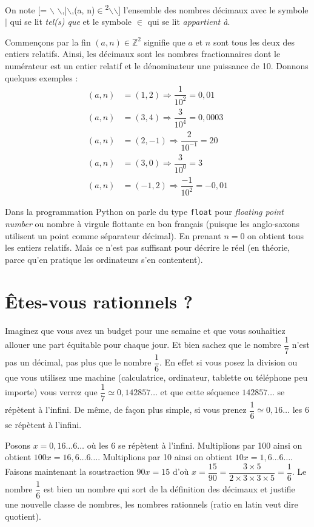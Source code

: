 \documentclass[a4paper, 11pt, twoside]{book}
\newcommand{\Z}{\mathbb{Z}}
\newcommand{\D}{\mathbb{D}}
\begin{document}
On note [\D = \left$\backslash${ $\backslash$,|$\backslash$,(a, n)\(\in\)\Z\textsuperscript{2\right}$\backslash$}$\backslash$]
l'ensemble des nombres décimaux avec le symbole \(|\) qui se lit
\emph{tel(s) que} et le symbole \(\in\) qui se lit \emph{appartient à}.

Commençons par la fin \((a, n)\in\Z^2\) signifie que \(a\) et
\(n\) sont tous les deux des entiers relatifs. Ainsi, les décimaux
sont les nombres fractionnaires dont le numérateur est un entier
relatif et le dénominateur une puissance de 10. Donnons quelques
exemples :
\begin{align*}
(a, n) &= (1, 2)\Rightarrow \dfrac{1}{10^2} = 0,01\\
(a, n) &= (3, 4)\Rightarrow \dfrac{3}{10^4} = 0,0003\\
(a, n) &= (2, -1)\Rightarrow \dfrac{2}{10^{-1}} = 20\\
(a, n) &= (3, 0)\Rightarrow \dfrac{3}{10^0} = 3\\
(a, n) &= (-1, 2)\Rightarrow \dfrac{-1}{10^2} = -0,01
\end{align*}

Dans la programmation Python on parle du type \texttt{float} pour
\emph{floating point number} ou nombre à virgule flottante en bon
français (puisque les anglo-saxons utilisent un point comme
séparateur décimal). En prenant \(n = 0\) on obtient tous les entiers
relatifs. Mais ce n'est pas suffisant pour décrire le réel (en
théorie, parce qu'en pratique les ordinateurs s'en contentent).

\section{Êtes-vous rationnels ?}
\label{sec:orgd8dac22}

Imaginez que vous avez un budget pour une semaine et que vous
souhaitiez allouer une part équitable pour chaque jour. Et bien
sachez que le nombre \(\dfrac{1}{7}\) n'est pas un décimal, pas plus
que le nombre \(\dfrac{1}{6}\). En effet si vous posez la division ou
que vous utilisez une machine (calculatrice, ordinateur, tablette
ou téléphone peu importe) vous verrez que \(\dfrac{1}{7} \simeq
   0,142857\dots\) et que cette séquence \(142857\dots\) se répètent à
l'infini. De même, de façon plus simple, si vous prenez
\(\dfrac{1}{6} \simeq 0,16\dots\) les 6 se répètent à l'infini.

Posons \(x = 0,16\dots 6\dots\) où les 6 se répètent à
l'infini. Multiplions par 100 ainsi on obtient \(100x = 16,6\dots
   6\dots\). Multiplions par 10 ainsi on obtient \(10x = 1,6\dots
   6\dots\). Faisons maintenant la soustraction \(90x = 15\) d'où \(x =
   \dfrac{15}{90} = \dfrac{3\times 5}{2\times 3\times 3\times 5} =
   \dfrac{1}{6}\). Le nombre \(\dfrac{1}{6}\) est bien un nombre qui sort
de la définition des décimaux et justifie une nouvelle classe de
nombres, les nombres rationnels (ratio en latin veut dire
quotient).
\end{document}
